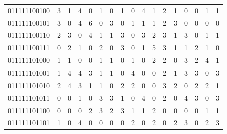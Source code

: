\documentclass[10pt,a4paper]{article}
\begin{document}
\begin{longtable}{ |c|c|c|c|c|c|c|c|c|c|c|c|c|c|c|c|c| }
    011111100100              & 3                            & 1                                & 4                            & 0                              & 1   & 0   & 1   & 0   & 4   & 1   & 2   & 1   & 0   & 0   & 1   & 1   \\
    011111100101              & 3                            & 0                                & 4                            & 6                              & 0   & 3   & 0   & 1   & 1   & 1   & 2   & 3   & 0   & 0   & 0   & 0   \\
    011111100110              & 2                            & 3                                & 0                            & 4                              & 1   & 1   & 3   & 0   & 3   & 2   & 3   & 1   & 3   & 0   & 1   & 1   \\
    011111100111              & 0                            & 2                                & 1                            & 0                              & 2   & 0   & 3   & 0   & 1   & 5   & 3   & 1   & 1   & 2   & 1   & 0   \\
    011111101000              & 1                            & 1                                & 0                            & 0                              & 1   & 1   & 0   & 1   & 0   & 2   & 2   & 0   & 3   & 2   & 4   & 1   \\
    011111101001              & 1                            & 4                                & 4                            & 3                              & 1   & 1   & 0   & 4   & 0   & 0   & 2   & 1   & 3   & 3   & 0   & 3   \\
    011111101010              & 2                            & 4                                & 3                            & 1                              & 1   & 0   & 2   & 2   & 0   & 0   & 3   & 2   & 0   & 2   & 2   & 1   \\
    011111101011              & 0                            & 0                                & 1                            & 0                              & 3   & 3   & 1   & 0   & 4   & 0   & 2   & 0   & 4   & 3   & 0   & 3   \\
    011111101100              & 0                            & 0                                & 0                            & 2                              & 3   & 2   & 3   & 1   & 1   & 2   & 0   & 0   & 0   & 0   & 1   & 1   \\
    011111101101              & 1                            & 0                                & 4                            & 0                              & 0   & 0   & 0   & 2   & 0   & 2   & 0   & 2   & 3   & 0   & 2   & 3   \\

\end{longtable}
\end{document}

